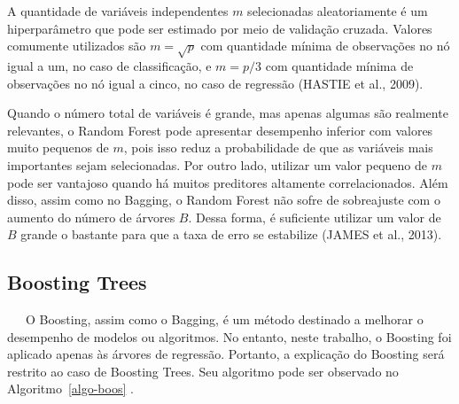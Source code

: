 \documentclass[
  12pt,
  a4paper,
]{scrreprt}
\begin{document}
\vspace{12pt}

A quantidade de variáveis independentes \(m\) selecionadas
aleatoriamente é um hiperparâmetro que pode ser estimado por meio de
validação cruzada. Valores comumente utilizados são \(m = \sqrt{p}\) com
quantidade mínima de observações no nó igual a um, no caso de
classificação, e \(m = p/3\) com quantidade mínima de observações no nó
igual a cinco, no caso de regressão (HASTIE et al., 2009).

\vspace{12pt}

Quando o número total de variáveis é grande, mas apenas algumas são
realmente relevantes, o Random Forest pode apresentar desempenho
inferior com valores muito pequenos de \(m\), pois isso reduz a
probabilidade de que as variáveis mais importantes sejam selecionadas.
Por outro lado, utilizar um valor pequeno de \(m\) pode ser vantajoso
quando há muitos preditores altamente correlacionados. Além disso, assim
como no Bagging, o Random Forest não sofre de sobreajuste com o aumento
do número de árvores \(B\). Dessa forma, é suficiente utilizar um valor
de \(B\) grande o bastante para que a taxa de erro se estabilize (JAMES
et al., 2013).

\subsection{Boosting Trees}\label{boosting-trees}

~~~O Boosting, assim como o Bagging, é um método destinado a melhorar o
desempenho de modelos ou algoritmos. No entanto, neste trabalho, o
Boosting foi aplicado apenas às árvores de regressão. Portanto, a
explicação do Boosting será restrito ao caso de Boosting Trees. Seu
algoritmo pode ser observado no  Algoritmo~\ref{algo-boos} .

\vspace{12pt}
\end{document}
